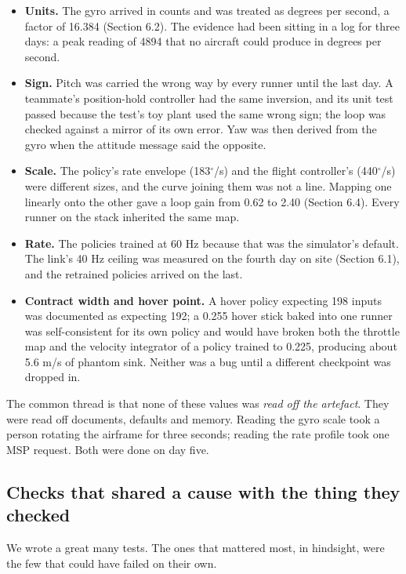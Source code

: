 \documentclass{article}
\begin{document}
\begin{itemize}[leftmargin=*]
\item \textbf{Units.} The gyro arrived in counts and was treated as degrees per second, a factor of 16.384 (Section 6.2). The evidence had been sitting in a log for three days: a peak reading of 4894 that no aircraft could produce in degrees per second.
\item \textbf{Sign.} Pitch was carried the wrong way by every runner until the last day. A teammate's position-hold controller had the same inversion, and its unit test passed because the test's toy plant used the same wrong sign; the loop was checked against a mirror of its own error. Yaw was then derived from the gyro when the attitude message said the opposite.
\item \textbf{Scale.} The policy's rate envelope (183$^\circ$/s) and the flight controller's (440$^\circ$/s) were different sizes, and the curve joining them was not a line. Mapping one linearly onto the other gave a loop gain from 0.62 to 2.40 (Section 6.4). Every runner on the stack inherited the same map.
\item \textbf{Rate.} The policies trained at 60 Hz because that was the simulator's default. The link's 40 Hz ceiling was measured on the fourth day on site (Section 6.1), and the retrained policies arrived on the last.
\item \textbf{Contract width and hover point.} A hover policy expecting 198 inputs was documented as expecting 192; a 0.255 hover stick baked into one runner was self-consistent for its own policy and would have broken both the throttle map and the velocity integrator of a policy trained to 0.225, producing about 5.6 m/s of phantom sink. Neither was a bug until a different checkpoint was dropped in.
\end{itemize}
The common thread is that none of these values was \emph{read off the artefact}. They were read off documents, defaults and memory. Reading the gyro scale took a person rotating the airframe for three seconds; reading the rate profile took one MSP request. Both were done on day five.

\subsection{Checks that shared a cause with the thing they checked}
We wrote a great many tests. The ones that mattered most, in hindsight, were the few that could have failed on their own.
\end{document}
